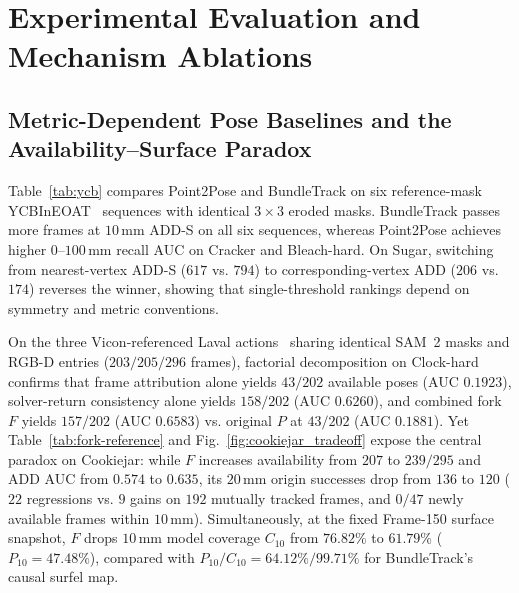\documentclass[10pt,journal]{IEEEtran}
\begin{document}
\section{Experimental Evaluation and Mechanism Ablations}
\label{sec:experiments}

\subsection{Metric-Dependent Pose Baselines and the Availability--Surface Paradox}
Table~\ref{tab:ycb} compares Point2Pose and BundleTrack on six reference-mask YCBInEOAT~\cite{tracknet} sequences with identical $3\times 3$ eroded masks. BundleTrack passes more frames at $10\,\mathrm{mm}$ ADD-S on all six sequences, whereas Point2Pose achieves higher $0$--$100\,\mathrm{mm}$ recall AUC on Cracker and Bleach-hard. On Sugar, switching from nearest-vertex ADD-S ($617$ vs. $794$) to corresponding-vertex ADD ($206$ vs. $174$) reverses the winner, showing that single-threshold rankings depend on symmetry and metric conventions.

\begin{table}[t]\centering\scriptsize
\caption{Selected reference-mask YCBInEOAT development results. Counts are ADD-S successes within 10 mm; AUC is failure-inclusive over 0--100 mm. The last action was selected subsequently. P2P: Point2Pose; BT: BundleTrack.}\label{tab:ycb}

\end{table}

On the three Vicon-referenced Laval actions~\cite{laval} sharing identical SAM~2 masks and RGB-D entries ($203/205/296$ frames), factorial decomposition on Clock-hard confirms that frame attribution alone yields $43/202$ available poses (AUC $0.1923$), solver-return consistency alone yields $158/202$ (AUC $0.6260$), and combined fork $F$ yields $157/202$ (AUC $0.6583$) vs. original $P$ at $43/202$ (AUC $0.1881$). Yet Table~\ref{tab:fork-reference} and Fig.~\ref{fig:cookiejar_tradeoff} expose the central paradox on Cookiejar: while $F$ increases availability from $207$ to $239/295$ and ADD AUC from $0.574$ to $0.635$, its $20\,\mathrm{mm}$ origin successes drop from $136$ to $120$ ($22$ regressions vs. $9$ gains on $192$ mutually tracked frames, and $0/47$ newly available frames within $10\,\mathrm{mm}$). Simultaneously, at the fixed Frame-150 surface snapshot, $F$ drops $10\,\mathrm{mm}$ model coverage $C_{10}$ from $76.82\%$ to $61.79\%$ ($P_{10}=47.48\%$), compared with $P_{10}/C_{10}=64.12\%/99.71\%$ for BundleTrack's causal surfel map.
\end{document}
